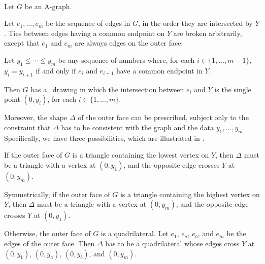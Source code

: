 \begin{thm}\ %
\begin{compactitem}
\item Let $G$ be an A-graph.
\item Let $e_1,\ldots,e_m$ be the sequence of edges in $G$,
  in the order they are intersected by $Y$. Ties between edges having
  a common endpoint on $Y$ are broken arbitrarily,
except that $e_1$ and $e_m$ are
always edges on the outer face.
\item Let $y_1\le\cdots\le y_m$ be any sequence of numbers where, for
  each $i\in\{1,\ldots,m-1\}$, $y_i=y_{i+1}$ if and only if $e_i$
  and $e_{i+1}$ have a common endpoint in $Y$.
			
			
\end{compactitem}
Then $G$ has a \Fary\ drawing in which the intersection
between $e_i$ and $Y$ is the single point $(0,y_i)$, for each
$i\in\{1,\ldots,m\}$.

Moreover, the shape  $\Delta$ of the outer face can be prescribed,
subject only to the constraint that $\Delta$
has to be consistent with the graph and the data $y_1,\ldots,y_m$.
Specifically, we have three possibilities, which
 are illustrated in .

\begin{compactenum}[a)]
\item If the outer face of $G$ is a triangle containing the lowest
  vertex on $Y$, then $\Delta$ must be a triangle with a vertex at
	$(0,y_1)$, and the opposite edge crosses $Y$ at $(0,y_m)$.
\item Symmetrically, if the outer face of $G$ is a triangle containing
  the highest vertex on $Y$, then $\Delta$ must be a triangle with a vertex
	at $(0,y_m)$, and the opposite edge crosses $Y$ at $(0,y_1)$.
\item Otherwise, the outer face of $G$ is a quadrilateral.  Let $e_1$,
  $e_a$, $e_b$, and $e_m$ be the %
  edges of the outer face.  Then $\Delta$ has to be a quadrilateral
	whose edges cross $Y$ at $(0,y_1)$, $(0,y_a)$, $(0,y_b)$, and $(0,y_m)$.
\end{compactenum}
\end{thm}

